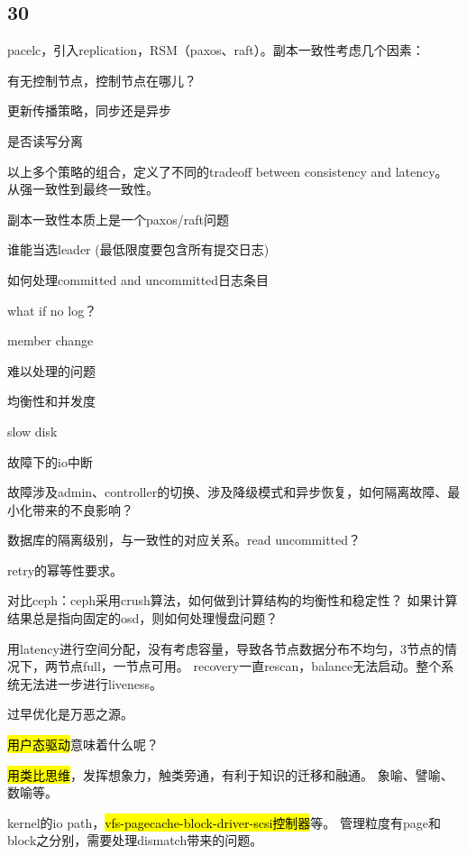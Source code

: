 \subsection{30}

pacelc，引入replication，RSM（paxos、raft）。副本一致性考虑几个因素：
\begin{enumbox}
\item 有无控制节点，控制节点在哪儿？
\item 更新传播策略，同步还是异步
\item 是否读写分离
\end{enumbox}

以上多个策略的组合，定义了不同的tradeoff between consistency and latency。
从强一致性到最终一致性。

副本一致性本质上是一个paxos/raft问题
\begin{enumbox}
\item 谁能当选leader (最低限度要包含所有提交日志)
\item 如何处理committed and uncommitted日志条目
\item what if no log？
\item member change
\end{enumbox}

难以处理的问题
\begin{enumbox}
\item 均衡性和并发度
\item slow disk
\item 故障下的io中断
\end{enumbox}

故障涉及admin、controller的切换、涉及降级模式和异步恢复，如何隔离故障、最小化带来的不良影响？

数据库的隔离级别，与一致性的对应关系。read uncommitted？

retry的幂等性要求。

对比ceph：ceph采用crush算法，如何做到计算结构的均衡性和稳定性？
如果计算结果总是指向固定的osd，则如何处理慢盘问题？

用latency进行空间分配，没有考虑容量，导致各节点数据分布不均匀，3节点的情况下，两节点full，一节点可用。
recovery一直rescan，balance无法启动。整个系统无法进一步进行liveness。

过早优化是万恶之源。

\hrulefill

\hl{用户态驱动}意味着什么呢？

\hl{用类比思维}，发挥想象力，触类旁通，有利于知识的迁移和融通。
象喻、譬喻、数喻等。

kernel的io path，\hl{vfs-pagecache-block-driver-scsi控制器}等。
管理粒度有page和block之分别，需要处理dismatch带来的问题。

